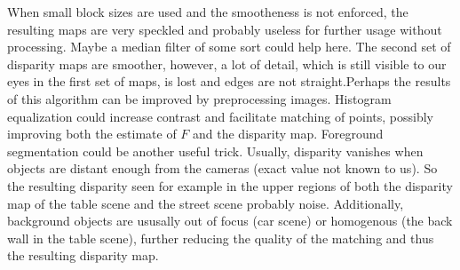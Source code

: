 \documentclass[11pt,a4paper]{article}
\begin{document}
When small block sizes are used and the smootheness is not enforced, the resulting maps are very speckled and probably useless for further usage without processing. Maybe a median filter of some sort could help here. The second set of disparity maps are smoother, however, a lot of detail, which is still visible to our eyes in the first set of maps, is lost and edges are not straight.Perhaps the results of this algorithm can be improved by preprocessing images. Histogram equalization could increase contrast and facilitate matching of points, possibly improving both the estimate of $F$ and the disparity map. Foreground segmentation could be another useful trick. Usually, disparity vanishes when objects are distant enough from the cameras (exact value not known to us). So the resulting disparity seen for example in the upper regions of both the disparity map of the table scene and the street scene probably noise. Additionally, background objects are ususally out of focus (car scene) or homogenous (the back wall in the table scene), further reducing the quality of the matching and thus the resulting disparity map.
\end{document}

